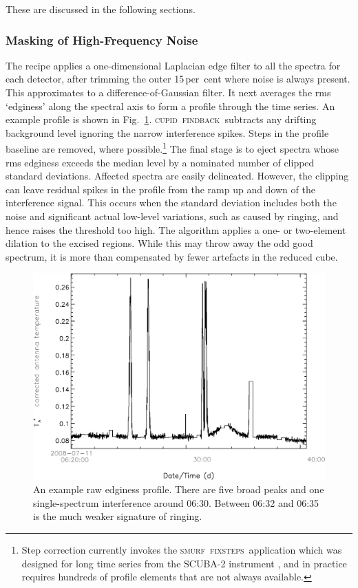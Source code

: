 \documentclass[useAMS,usenatbib]{mn2e}
\newcommand{\cupid}{\textsc{cupid}}
\newcommand{\smurf}{\textsc{smurf}}
\newcommand{\findback}{\textsc{findback}}
\newcommand{\fixsteps}{\textsc{fixsteps}}
\begin{document}
These are discussed in the following sections.

\subsubsection{Masking of High-Frequency Noise}

The recipe applies a one-dimensional Laplacian edge filter to all the
spectra for each detector, after trimming the outer 15\,per~cent where noise
is always present.  This approximates to a difference-of-Gaussian
filter.  It next averages the rms `edginess' along the spectral axis
to form a profile through the time series.  An example profile is
shown in Fig.~\ref{fig:badbase:raw_edginess_profile}.  \cupid\
\findback\ subtracts any drifting background level ignoring the narrow
interference spikes.  Steps in the profile baseline are removed, where
possible.\footnote{Step correction currently invokes the \smurf\ \fixsteps\
application which was designed for long time series from the SCUBA-2
instrument \citep{2013MNRAS.430.2513H}, and in practice
requires hundreds of profile elements that are not always available.}
The final stage is to eject spectra whose rms edginess exceeds the
median level by a nominated number of clipped standard deviations.
Affected spectra are easily delineated.  However, the clipping can
leave residual spikes in the profile from the ramp up and down of the
interference signal.  This occurs when the standard deviation includes
both the noise and significant actual low-level variations, such as
caused by ringing, and hence raises the threshold too high.  The
algorithm applies a one- or two-element dilation to the excised
regions.  While this may throw away the odd good spectrum, it is more
than compensated by fewer artefacts in the reduced cube.


\begin{figure}
\includegraphics[width=\columnwidth]{raw_edginess_profile}
\caption{An example raw edginess profile.  There are five broad
  peaks and one single-spectrum interference around 06:30.  Between
  06:32 and 06:35 is the much weaker signature of ringing.}
\label{fig:badbase:raw_edginess_profile}
\end{figure}
\end{document}
